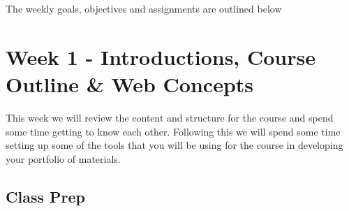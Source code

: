 \documentclass[]{book}
\begin{document}
The weekly goals, objectives and assignments are outlined below

\chapter{Week 1 - Introductions, Course Outline \& Web
Concepts}\label{week01}

This week we will review the content and structure for the course and
spend some time getting to know each other. Following this we will spend
some time setting up some of the tools that you will be using for the
course in developing your portfolio of materials.

\section{Class Prep}\label{week01-prep}
\end{document}
